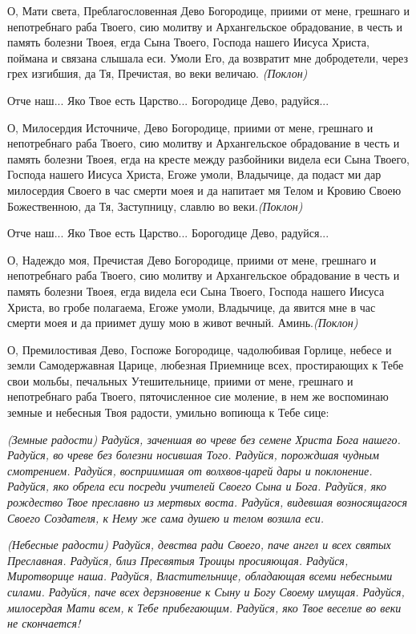 О, Мати света, Преблагословенная Дево Богородице, приими от мене, грешнаго и непотребнаго раба Твоего, сию молитву и Архангельское обрадование, в честь и память болезни Твоея, егда Сына Твоего, Господа нашего Иисуса Христа, поймана и связана слышала еси. Умоли Его, да возвратит мне добродетели, через грех изгибшия, да Тя, Пречистая, во веки величаю. \itshape (Поклон)\normalfont{}




Отче наш... Яко Твое есть Царство... Богородице Дево, радуйся...

О, Милосердия Источниче, Дево Богородице, приими от мене, грешнаго и непотребнаго раба Твоего, сию молитву и Архангельское обрадование в честь и память болезни Твоея, егда на кресте между разбойники видела еси Сына Твоего, Господа нашего Иисуса Христа, Егоже умоли, Владычице, да подаст ми дар милосердия Своего в час смерти моея и да напитает мя Телом и Кровию Своею Божественною, да Тя, Заступницу, славлю во веки.\itshape  (Поклон)\normalfont{}




Отче наш... Яко Твое есть Царство... Борогодице Дево, радуйся...

О, Надеждо моя, Пречистая Дево Богородице, приими от мене, грешнаго и непотребнаго раба Твоего, сию молитву и Архангельское обрадование в честь и память болезни Твоея, егда видела еси Сына Твоего, Господа нашего Иисуса Христа, во гробе полагаема, Егоже умоли, Владычице, да явится мне в час смерти моея и да приимет душу мою в живот вечный. Аминь.\itshape  (Поклон)

\normalfont{}О, Премилостивая Дево, Госпоже Богородице, чадолюбивая Горлице, небесе и земли Самодержавная Царице, любезная Приемнице всех, простирающих к Тебе свои мольбы, печальных Утешительнице, приими от мене, грешнаго и непотребнаго раба Твоего, пяточисленное сие моление, в нем же воспоминаю земные и небесныя Твоя радости, умильно вопиюща к Тебе сице: 

\itshape (Земные радости)\normalfont{} Радуйся, заченшая во чреве без семене Христа Бога нашего. Радуйся, во чреве без болезни носившая Того. Радуйся, порождшая чудным смотрением. Радуйся, восприимшая от волхвов-царей дары и поклонение. Радуйся, яко обрела еси посреди учителей Своего Сына и Бога. Радуйся, яко рождество Твое преславно из мертвых воста. Радуйся, видевшая возносящагося Своего Создателя, к Нему же сама душею и телом возшла еси.

\itshape (Небесные радости)\normalfont{} Радуйся, девства ради Своего, паче ангел и всех святых Преславная. Радуйся, близ Пресвятыя Троицы просияющая. Радуйся, Миротворице наша. Радуйся, Властительнице, обладающая всеми небесными силами. Радуйся, паче всех дерзновение к Сыну и Богу Своему имущая. Радуйся, милосердая Мати всем, к Тебе прибегающим. Радуйся, яко Твое веселие во веки не скончается!

